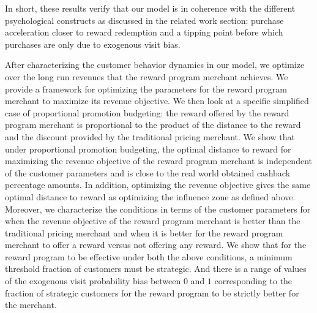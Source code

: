 In short, these results verify that our model is in coherence with the different psychological constructs as discussed in the related work section: purchase acceleration closer to reward redemption and a tipping point before which purchases are only due to exogenous visit bias.

After characterizing the customer behavior dynamics in our model, we optimize over the long run revenues that the reward program merchant achieves.
We provide a framework for optimizing the parameters for the reward program merchant to maximize its revenue objective.
We then look at a specific simplified case of proportional promotion budgeting: the reward offered by the reward program merchant is proportional to the product of the distance to the reward and the discount provided by the traditional pricing merchant.
We show that under proportional promotion budgeting, the optimal distance to reward for maximizing the revenue objective of the reward program merchant is independent of the customer parameters and is close to the real world obtained cashback percentage amounts.
In addition, optimizing the revenue objective gives the same optimal distance to reward as optimizing the influence zone as defined above.
Moreover, we characterize the conditions in terms of the customer parameters for when the revenue objective of the reward program merchant is better than the traditional pricing merchant and when it is better for the reward program merchant to offer a reward versus not offering any reward.
We show that for the reward program to be effective under both the above conditions, a minimum threshold fraction of customers must be strategic.
And there is a range of values of the exogenous visit probability bias between $0$ and $1$ corresponding to the fraction of strategic customers for the reward program to be strictly better for the merchant. 
